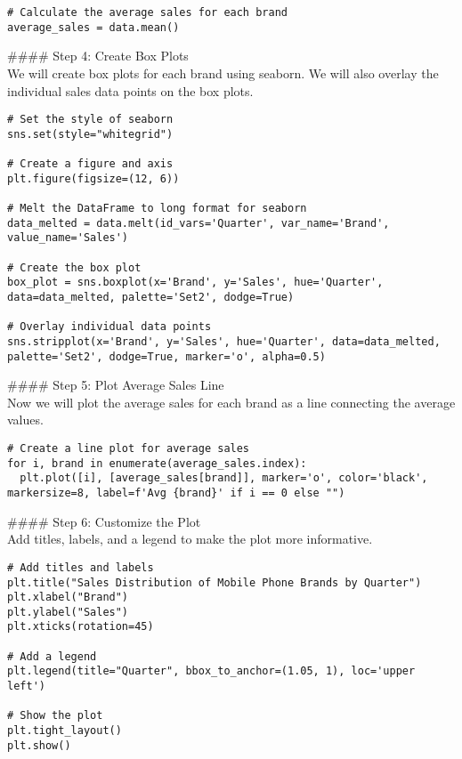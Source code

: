\begin{mdframed}[backgroundcolor=gray!20, linewidth=1pt]
\begin{lstlisting}[style=pythonstyle]
# Calculate the average sales for each brand
average_sales = data.mean()
\end{lstlisting}

\#\#\#\# Step 4: Create Box Plots\\
We will create box plots for each brand using seaborn. We will also overlay the individual sales data points on the box plots.

\begin{lstlisting}[style=pythonstyle]
# Set the style of seaborn
sns.set(style="whitegrid")

# Create a figure and axis
plt.figure(figsize=(12, 6))

# Melt the DataFrame to long format for seaborn
data_melted = data.melt(id_vars='Quarter', var_name='Brand', value_name='Sales')

# Create the box plot
box_plot = sns.boxplot(x='Brand', y='Sales', hue='Quarter', data=data_melted, palette='Set2', dodge=True)

# Overlay individual data points
sns.stripplot(x='Brand', y='Sales', hue='Quarter', data=data_melted, palette='Set2', dodge=True, marker='o', alpha=0.5)
\end{lstlisting}

\#\#\#\# Step 5: Plot Average Sales Line\\
Now we will plot the average sales for each brand as a line connecting the average values.

\begin{lstlisting}[style=pythonstyle]
# Create a line plot for average sales
for i, brand in enumerate(average_sales.index):
  plt.plot([i], [average_sales[brand]], marker='o', color='black', markersize=8, label=f'Avg {brand}' if i == 0 else "")
\end{lstlisting}

\#\#\#\# Step 6: Customize the Plot\\
Add titles, labels, and a legend to make the plot more informative.

\begin{lstlisting}[style=pythonstyle]
# Add titles and labels
plt.title("Sales Distribution of Mobile Phone Brands by Quarter")
plt.xlabel("Brand")
plt.ylabel("Sales")
plt.xticks(rotation=45)

# Add a legend
plt.legend(title="Quarter", bbox_to_anchor=(1.05, 1), loc='upper left')

# Show the plot
plt.tight_layout()
plt.show()
\end{lstlisting}


\end{mdframed}
